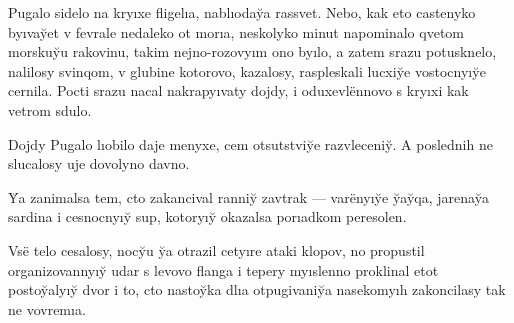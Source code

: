 \documentclass[10pt]{book}
\begin{document}
\newcommand{\e}{ë}

\renewcommand{\i}{ı}

\newcommand{\yi}{yı}

\newcommand{\ia}{ıa}

\newcommand{\iu}{ıo}

\newcommand{\y}{y̆}
\newcommand{\yf}{y̆}

\newcommand{\Y}{Y̆}

\newcommand{\C}{C}
\renewcommand{\c}{c}

\newcommand{\X}{X̨}
\newcommand{\x}{x̨}
\newcommand{\Q}{Q}
\newcommand{\q}{q}

% 
% 
% 
% 

Pugalo sidelo na kr{\yi}xe fligel{\ia}, nabl{\iu}da{\y}a rassvet. Nebo, kak eto {\c}astenyko b{\yi}va{\y}et v fevrale nedaleko ot mor{\ia}, neskolyko minut napominalo {\q}vetom morsku{\y}u rakovinu, takim nejno-rozov{\yi}m ono b{\yi}lo, a zatem srazu potusknelo, nalilosy svin{\q}om, v glubine kotorovo, kazalosy, raspleskali lu{\c}xi{\y}e vosto{\c}n{\yi}{\y}e {\c}ernila. Po{\c}ti srazu na{\c}al nakrap{\yi}vaty dojdy, i oduxevl{\e}nnovo s kr{\yi}xi kak vetrom sdulo.

Dojdy Pugalo l{\iu}bilo daje menyxe, {\c}em otsutstvi{\y}e razvle{\c}eni{\y}. A poslednih ne slu{\c}alosy uje dovolyno davno.

{\Y}a zanimalsa tem, {\c}to zakan{\c}ival ranni{\y} zavtrak — var{\e}n{\yi}{\y}e {\y}a{\y}{\q}a, jarena{\y}a sardina i {\c}esno{\c}n{\yi}{\y} sup, kotor{\yi}{\y} okazalsa por{\ia}dkom peresolen.

Vs{\e} telo {\c}esalosy, no{\c}{\y}u {\y}a otrazil {\c}et{\yi}re ataki klopov, no propustil organizovann{\yi}{\y} udar s levovo flanga i tepery m{\yi}slenno proklinal etot posto{\y}al{\yi}{\y} dvor i to, {\c}to nasto{\y}ka dl{\ia} otpugivani{\y}a nasekom{\yi}h zakon{\c}ilasy tak ne vovrem{\ia}.
\end{document}
